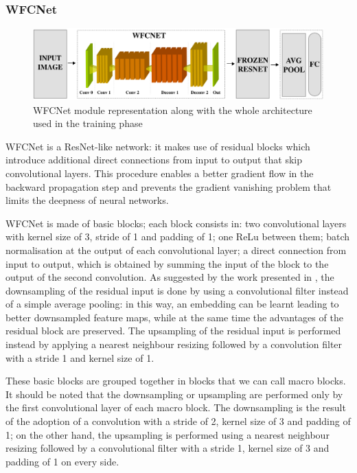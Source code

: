 \documentclass[10pt,twocolumn,letterpaper]{article}
\begin{document}
\subsubsection{WFCNet}

\begin{figure}
	\begin{center}
		\includegraphics[width=\textwidth]{schemi/WFCNet_img.pdf}		
	\end{center}
	\caption{WFCNet module representation along with the whole architecture used in the training phase}
	\label{fig:WFCNet}
\end{figure}

WFCNet is a ResNet-like network: it makes use of residual blocks which introduce additional direct connections from input to output that skip convolutional layers. This procedure enables a better gradient flow in the backward propagation step and prevents the gradient vanishing problem that limits the deepness of neural networks.

WFCNet is made of basic blocks; each block consists in: two convolutional layers with kernel size of 3, stride of 1 and padding of 1; one ReLu between them; batch normalisation at the output of each convolutional layer; a direct connection from input to output, which is obtained by summing the input of the block to the output of the second convolution.
As suggested by the work presented in \cite{springenberg2014striving}, the downsampling of the residual input is done by using a convolutional filter instead of a simple average pooling: in this way, an embedding can be learnt leading to better downsampled feature maps, while at the same time the advantages of the residual block are preserved.
The upsampling of the residual input is performed instead by applying a nearest neighbour resizing followed by a convolution filter with a stride 1 and kernel size of 1.

These basic blocks are grouped together in blocks that we can call macro blocks. It should be noted that the downsampling or upsampling are performed only by the first convolutional layer of each macro block. The downsampling is the result of the adoption of a convolution with a stride of 2, kernel size of 3 and padding of 1; on the other hand, the upsampling is performed using a nearest neighbour resizing followed by a convolutional filter with a stride 1, kernel size of 3 and padding of 1 on every side. 
\end{document}
